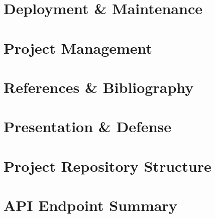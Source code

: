 \documentclass[11pt,a4paper]{report}
\begin{document}


\chapter{Deployment \& Maintenance}
\label{sec:3-11}



\chapter{Project Management}
\label{sec:3-12}



\chapter{References \& Bibliography}
\label{sec:3-13}



\chapter{Presentation \& Defense}
\label{sec:3-14}



\appendix
\chapter{Project Repository Structure}
\label{app:a}


\chapter{API Endpoint Summary}
\label{app:b}

\end{document}
